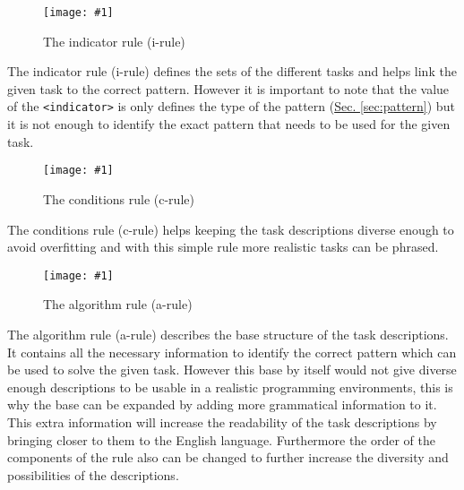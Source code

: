 \documentclass[12pt]{article}
\newcommand{\refThis}[2]{\hyperref[#1]{#2 \ref{#1}}}
\newcommand{\insertPic}[3]
{   %
        \begin{figure}[h!]				
        \centering							
        \texttt{[image: \#1]}
        \caption{#3}						
        \label{fig:#1}						
        \end{figure}		
}
\begin{document}
    \insertPic{i-rule}{0.45}{The indicator rule (i-rule)}
    The indicator rule (i-rule) defines the sets of the different tasks and helps link the given task to the correct pattern. However it is important to note that the value of the \verb|<indicator>| is only defines the type of the pattern (\refThis{sec:pattern}{Sec.}) but it is not enough to identify the exact pattern that needs to be used for the given task.
    
    \insertPic{c-rule}{0.45}{The conditions rule (c-rule)}
    The conditions rule (c-rule) helps keeping the task descriptions diverse enough to avoid overfitting and with this simple rule more realistic tasks can be phrased.
    
    \insertPic{a-rule}{0.45}{The algorithm rule (a-rule)}
    The algorithm rule (a-rule) describes the base structure of the task descriptions. It contains all the necessary information to identify the correct pattern which can be used to solve the given task. However this base by itself would not give diverse enough descriptions to be usable in a realistic programming environments, this is why the base can be expanded by adding more grammatical information to it. This extra information will increase the readability of the task descriptions by bringing closer to them to the English language. Furthermore the order of the components of the rule also can be changed to further increase the diversity and possibilities of the descriptions.  
    
\end{document}
